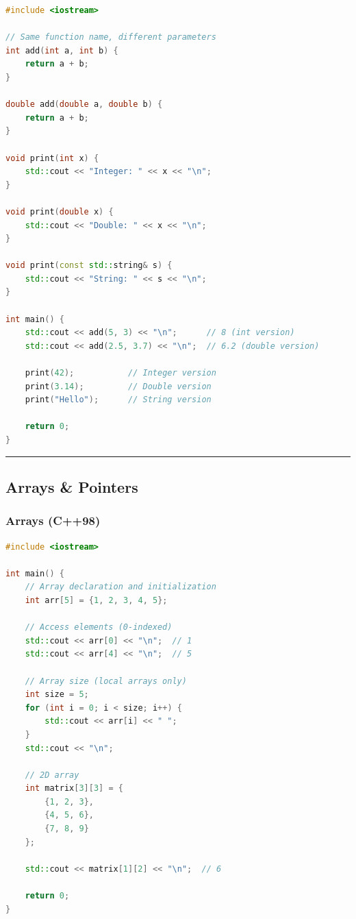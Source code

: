 \begin{lstlisting}[language={C++}]
#include <iostream>

// Same function name, different parameters
int add(int a, int b) {
    return a + b;
}

double add(double a, double b) {
    return a + b;
}

void print(int x) {
    std::cout << "Integer: " << x << "\n";
}

void print(double x) {
    std::cout << "Double: " << x << "\n";
}

void print(const std::string& s) {
    std::cout << "String: " << s << "\n";
}

int main() {
    std::cout << add(5, 3) << "\n";      // 8 (int version)
    std::cout << add(2.5, 3.7) << "\n";  // 6.2 (double version)

    print(42);           // Integer version
    print(3.14);         // Double version
    print("Hello");      // String version

    return 0;
}
\end{lstlisting}

\begin{center}\rule{0.5\linewidth}{0.5pt}\end{center}

\hypertarget{arrays-pointers}{%
\subsection{Arrays \& Pointers}\label{arrays-pointers}}

\hypertarget{arrays-c98}{%
\subsubsection{Arrays (C++98)}\label{arrays-c98}}

\begin{lstlisting}[language={C++}]
#include <iostream>

int main() {
    // Array declaration and initialization
    int arr[5] = {1, 2, 3, 4, 5};

    // Access elements (0-indexed)
    std::cout << arr[0] << "\n";  // 1
    std::cout << arr[4] << "\n";  // 5

    // Array size (local arrays only)
    int size = 5;
    for (int i = 0; i < size; i++) {
        std::cout << arr[i] << " ";
    }
    std::cout << "\n";

    // 2D array
    int matrix[3][3] = {
        {1, 2, 3},
        {4, 5, 6},
        {7, 8, 9}
    };

    std::cout << matrix[1][2] << "\n";  // 6

    return 0;
}
\end{lstlisting}


